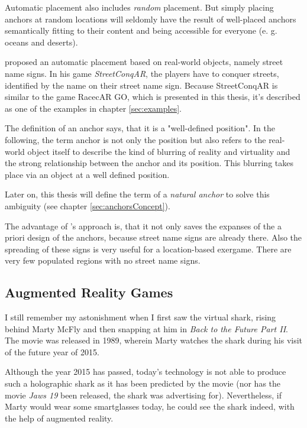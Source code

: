 Automatic placement also includes \emph{random} placement. But simply placing anchors at random locations will seldomly have the result of well-placed anchors semantically fitting to their content and being accessible for everyone (e. g. oceans and deserts).

\citeauthor{hock2014augmented} proposed an automatic placement based on real-world objects, namely street name signs. In his game \emph{StreetConqAR}, the players have to conquer streets, identified by the name on their street name sign. Because StreetConqAR is similar to the game RacecAR GO, which is presented in this thesis, it's described as one of the examples in chapter \ref{sec:examples}.

The definition of an anchor says, that it is a "well-defined position". In the following, the term anchor is not only the position but also refers to the real-world object itself to describe the kind of blurring of reality and virtuality and the strong relationship between the anchor and its position. This blurring takes place via an object at a well defined position.

Later on, this thesis will define the term of a \emph{natural anchor} to solve this ambiguity (see chapter \ref{sec:anchorsConcept}).

The advantage of \citeauthor{hock2014augmented}'s approach is, that it not only saves the expanses of the a priori design of the anchors, because street name signs are already there. Also the spreading of these signs is very useful for a location-based exergame. There are very few populated regions with no street name signs.

\subsection{Augmented Reality Games}\label{sec:augmentedRealityStateOfTheArt}
I still remember my astonishment when I first saw the virtual shark, rising behind Marty McFly and then snapping at him in \emph{Back to the Future Part II}. The movie was released in 1989, wherein Marty watches the shark during his visit of the future year of 2015.

Although the year 2015 has passed, today's technology is not able to produce such a holographic shark as it has been predicted by the movie (nor has the movie \emph{Jaws 19} been released, the shark was advertising for).
Nevertheless, if Marty would wear some smartglasses today, he could see the shark indeed, with the help of augmented reality.

